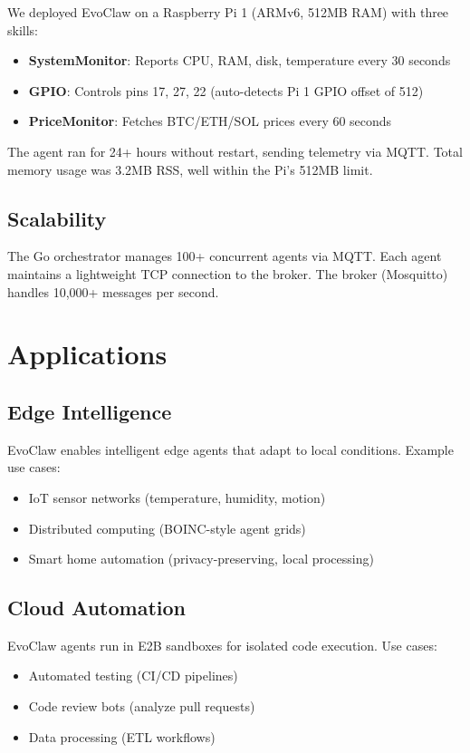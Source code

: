 \documentclass{article}
\begin{document}
We deployed EvoClaw on a Raspberry Pi 1 (ARMv6, 512MB RAM) with three skills:
\begin{itemize}
    \item \textbf{SystemMonitor}: Reports CPU, RAM, disk, temperature every 30 seconds
    \item \textbf{GPIO}: Controls pins 17, 27, 22 (auto-detects Pi 1 GPIO offset of 512)
    \item \textbf{PriceMonitor}: Fetches BTC/ETH/SOL prices every 60 seconds
\end{itemize}

The agent ran for 24+ hours without restart, sending telemetry via MQTT. Total memory usage was 3.2MB RSS, well within the Pi's 512MB limit.

\subsection{Scalability}

The Go orchestrator manages 100+ concurrent agents via MQTT. Each agent maintains a lightweight TCP connection to the broker. The broker (Mosquitto) handles 10,000+ messages per second.

\section{Applications}\label{sec:applications}

\subsection{Edge Intelligence}

EvoClaw enables intelligent edge agents that adapt to local conditions. Example use cases:
\begin{itemize}
    \item IoT sensor networks (temperature, humidity, motion)
    \item Distributed computing (BOINC-style agent grids)
    \item Smart home automation (privacy-preserving, local processing)
\end{itemize}

\subsection{Cloud Automation}

EvoClaw agents run in E2B sandboxes for isolated code execution. Use cases:
\begin{itemize}
    \item Automated testing (CI/CD pipelines)
    \item Code review bots (analyze pull requests)
    \item Data processing (ETL workflows)
\end{itemize}
\end{document}
